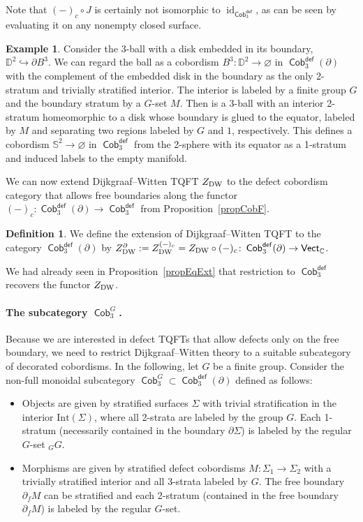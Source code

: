 \documentclass[10pt,a4paper]{amsart}
\DeclareMathOperator{\id}{id}
\DeclareMathOperator{\vect}{\mathsf{Vect}}
\DeclareMathOperator{\C}{\mathbb{C}}
\DeclareMathOperator{\Cob}{\mathsf{Cob}}
\numberwithin{equation}{section}
\theoremstyle{definition}
\newtheorem{Definition}[Definition]{Definition}
\newtheorem{Example}[Example]{Example}
\begin{document}
Note that $(-)_c \circ J$ is certainly not isomorphic to $ \id_{\Cob_3^{\mathsf{def}}}$, as can be seen by evaluating it on any nonempty closed surface.
\begin{Example}\label{exCompl}
Consider the 3-ball with a disk embedded in its boundary, $\mathbb{D}^2 \hookrightarrow \partial B^3$. We can regard the ball as a cobordism $B^3\colon \mathbb{D}^2 \rightarrow \varnothing$ in $\Cob_3^{\mathsf{def}}(\partial)$ with the complement of the embedded disk in the boundary as the only 2-stratum and trivially stratified interior. The interior is labeled by a finite group $G$ and the boundary stratum by a $G$-set $M$. Then  is a 3-ball with an interior 2-stratum homeomorphic to a disk whose boundary is glued to the equator, labeled by $M$ and separating two regions labeled by $G$ and $1$, respectively. This defines a cobordism $\mathbb{S}^2 \rightarrow \varnothing$ in $\Cob_3^{\mathsf{def}}$ from the 2-sphere with its equator as a 1-stratum and induced labels to the empty manifold.
\end{Example}

We can now extend Dijkgraaf--Witten TQFT $Z_{\rm DW}$ to the defect cobordism category that allows free boundaries along the functor $(-)_c\colon \Cob_3^{\mathsf{def}}(\partial) \rightarrow \Cob_3^{\mathsf{def}}$ from Proposition~\ref{propCobF}.
\begin{Definition}\label{defExtDW}
We define the extension of Dijkgraaf--Witten TQFT to the category $\Cob_3^{\mathsf{def}}(\partial)$ by $Z_{\rm DW}^{\partial} := Z_{\rm DW}^{(-)_c} = Z_{\rm DW} \circ (-)_c\colon \Cob_3^{\mathsf{def}}(\partial) \rightarrow \vect_{\C}$.
\end{Definition}

We had already seen in Proposition~\ref{propEqExt} that restriction to $\Cob_3^{\mathsf{def}}$ recovers the functor $Z_{\rm DW}$.

\paragraph{The subcategory $\Cob_3^G$.} Because we are interested in defect TQFTs that allow defects only on the free boundary, we need to restrict Dijkgraaf--Witten theory to a suitable subcategory of decorated cobordisms. In the following, let $G$ be a finite group. Consider the non-full monoidal subcategory $\Cob_3^G \subset \Cob_3^{\mathsf{def}}(\partial)$ defined as follows:
\begin{itemize}\itemsep=0pt
 \item Objects are given by stratified surfaces $\Sigma$ with trivial stratification in the interior $\mathrm{Int}(\Sigma)$, where all 2-strata are labeled by the group $G$. Each 1-stratum (necessarily contained in the boundary $\partial \Sigma$) is labeled by the regular $G$-set $_GG$.
 \item Morphisms are given by stratified defect cobordisms $M\colon \Sigma_1 \rightarrow \Sigma_2$ with a trivially stratified interior and all 3-strata labeled by $G$. The free boundary $\partial_fM$ can be stratified and each 2-stratum (contained in the free boundary $\partial_f M$) is labeled by the regular $G$-set.
\end{itemize}
\end{document}
